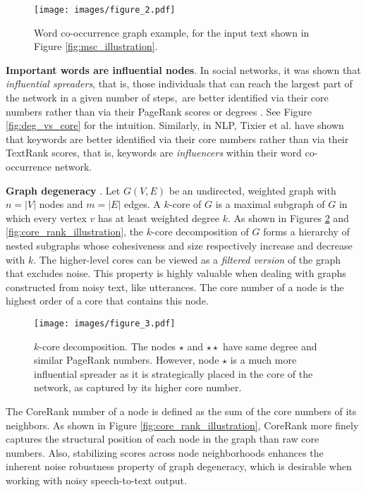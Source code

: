 \documentclass[11pt,a4paper]{article}
\begin{document}
\begin{figure}[ht]
\centering
\captionsetup{size=small}
\texttt{[image: images/figure\_2.pdf]}
\caption{
Word co-occurrence graph example, for the input text shown in Figure \ref{fig:msc_illustration}.
}
\label{fig:gow_illustration}
\end{figure}

\noindent \textbf{Important words are influential nodes}. In social networks, it was shown that \textit{influential spreaders}, that is, those individuals that can reach the largest part of the network in a given number of steps,~are better identified via their core numbers rather than via their PageRank scores or degrees \cite{kitsak2010identification}. See Figure \ref{fig:deg_vs_core} for the intuition. Similarly, in NLP, Tixier et al.  have shown that keywords are better identified via their core numbers rather than via their TextRank scores, that is, keywords are \textit{influencers} within their word co-occurrence network.

\noindent \textbf{Graph degeneracy} \cite{seidman1983network}. 
Let $G(V,E)$ be an undirected, weighted graph with $n=\left\vert{V}\right\vert$ nodes and $m= \left\vert{E}\right\vert$ edges. A $k$-core of $G$ is a maximal subgraph of $G$ in which every vertex $v$ has at least weighted degree $k$. As shown in Figures \ref{fig:kcore} and \ref{fig:core_rank_illustration}, the $k$-core decomposition of $G$ forms a hierarchy of nested subgraphs whose cohesiveness and size respectively increase and decrease with $k$. The higher-level cores can be viewed as a \textit{filtered version} of the graph that excludes noise. This property is highly valuable when dealing with graphs constructed from noisy text, like utterances.
The core number of a node is the highest order of a core that contains this node.

\begin{figure}[ht]
    \centering
    \captionsetup{size=small}
    \texttt{[image: images/figure\_3.pdf]}
	\caption{$k$-core decomposition. The nodes $\star$ and $\star\star$ have same degree and similar PageRank numbers. However, node $\star$ is a much more influential spreader as it is strategically placed in the core of the network, as captured by its higher core number.\label{fig:deg_vs_core}}
    \label{fig:kcore}
\end{figure}

The CoreRank number of a node \cite{tixier2016graph,bae2014identifying} is defined as the sum of the core numbers of its neighbors. As shown in Figure \ref{fig:core_rank_illustration}, CoreRank more finely captures the structural position of each node in the graph than raw core numbers. Also, stabilizing scores across node neighborhoods enhances the inherent noise robustness property of graph degeneracy, which is desirable when working with noisy speech-to-text output.
\end{document}

